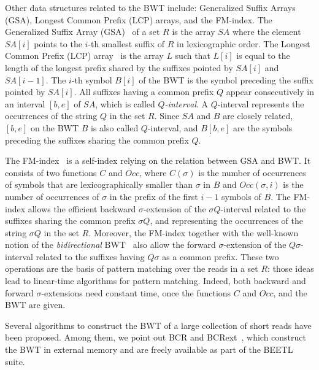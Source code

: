 \documentclass[11pt,oneside,a4paper]{article}
\newcommand{\SA}{\ensuremath{\mathit{SA}}}
\newcommand{\LCP}{\ensuremath{\mathit{L}}}
\begin{document}
Other data structures related to the BWT include: Generalized Suffix Arrays (GSA), Longest Common Prefix (LCP) arrays, and
the FM-index.
The Generalized Suffix Array (GSA)~\cite{Shi1996} of a set $R$ is the array
$\SA$ where the element $\SA[i]$ points to the $i$-th smallest suffix of $R$
in lexicographic order. 
The Longest Common Prefix (LCP) array~\cite{Manber93} is the array $\LCP$ such
that $\LCP[i]$ is equal to the length of the longest prefix shared by the suffixes
pointed by $\SA[i]$ and $\SA[i-1]$.
The $i$-th symbol $B[i]$ of the BWT is the symbol preceding the suffix pointed by 
$\SA[i]$.
All suffixes having a common prefix $Q$ appear consecutively in an interval
$[b,e]$ of $\SA$, which is called \emph{$Q$-interval}. A $Q$-interval represents the occurrences of the string $Q$ in the set $R$.
Since $\SA$ and $B$ are closely related, $[b,e]$ on the BWT $B$ is also called $Q$-interval, and $B[b,e]$ are the symbols preceding the suffixes sharing the common prefix $Q$.

The FM-index~\cite{Ferragina2005} is a self-index relying on the relation between GSA and BWT. It consists of two functions $C$ and
$Occ$, where $C(\sigma)$ is the number of occurrences of symbols that are lexicographically smaller than $\sigma$ in $B$
and
$Occ(\sigma,i)$ is the number of occurrences of $\sigma$ in the prefix of
the first $i-1$ symbols of $B$.
The FM-index allows the efficient backward $\sigma$-extension of the $\sigma Q$-interval related to the suffixes sharing the common prefix $\sigma Q$, and representing the occurrences of the string $\sigma Q$ in the set $R$. Moreover, the FM-index together with the well-known notion of the \emph{bidirectional} BWT~\cite{Lam2009} also allow the forward $\sigma$-extension of the $Q \sigma$-interval related to the suffixes having $Q \sigma$ as a common prefix. These two operations are the basis of pattern matching over the reads in a set $R$:
those ideas lead to linear-time algorithms for pattern matching.
%
Indeed, both backward and forward $\sigma$-extensions need constant time, once the functions $C$
and $Occ$, and the BWT are given. 

Several algorithms to construct the BWT of a large
collection of short reads have been proposed.
Among them, we point out BCR and BCRext~\cite{Bauer2011}, which 
construct the BWT in external memory and are freely available as part of the BEETL suite.
%
%
%
%
\end{document}
